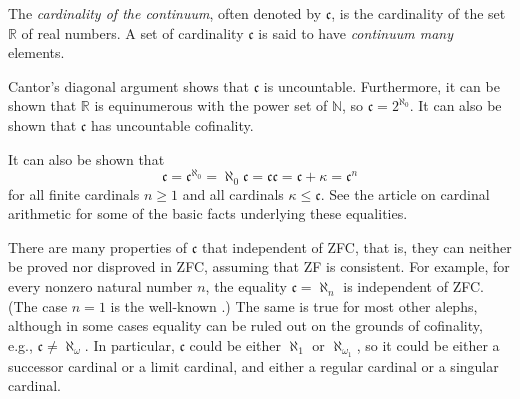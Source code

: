 \documentclass[12pt]{article}
\def\N{\mathbb{N}}
\def\R{\mathbb{R}}
\def\continuum{\mathfrak{c}}
\begin{document}

The \emph{cardinality of the continuum}, often denoted by $\continuum$, is 
the cardinality of the set $\R$ of real numbers.
A set of cardinality $\continuum$ is said to have \emph{continuum many} elements.

Cantor's diagonal argument shows that $\continuum$ is uncountable.
Furthermore, it can be shown that 
$\R$ is equinumerous with the power set of $\N$, so $\continuum=2^{\aleph_0}$.
It can also be shown that $\continuum$ has uncountable cofinality.

It can also be shown that
$$\continuum=\continuum^{\aleph_0}=\aleph_0\continuum=\continuum\continuum
=\continuum+\kappa=\continuum^n$$
for all finite cardinals $n\ge1$ and all cardinals $\kappa\le\continuum$.
See the article on cardinal arithmetic
for some of the basic facts underlying these equalities.

There are many properties of $\continuum$ that independent of ZFC,
that is, they can neither be proved nor disproved in ZFC,
assuming that ZF is consistent.
For example, for every nonzero natural number $n$, 
the equality $\continuum=\aleph_n$ is independent of ZFC.
(The case $n=1$ is the well-known
.)
The same is true for most other alephs, 
although in some cases equality can be ruled out on the grounds of cofinality,
e.g., $\continuum\neq\aleph_\omega$.
In particular,
$\continuum$ could be either $\aleph_1$ or $\aleph_{\omega_1}$,
so it could be either a successor cardinal or a limit cardinal,
and either a regular cardinal or a singular cardinal.
\end{document}
